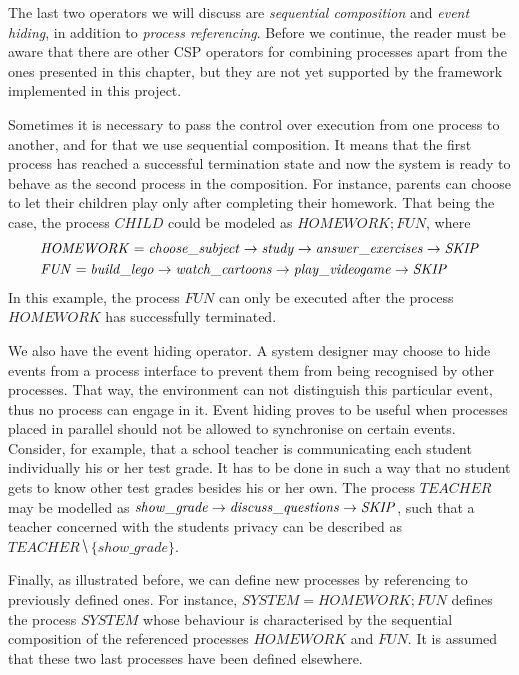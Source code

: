 The last two operators we will discuss are \emph{sequential composition} and \emph{event hiding}, in addition to \emph{process referencing}. Before we continue, the reader must be aware that there are other CSP operators for combining processes apart from the ones presented in this chapter, but they are not yet supported by the framework implemented in this project.

Sometimes it is necessary to pass the control over execution from one process to another, and for that we use sequential composition. It means that the first process has reached a successful termination state and now the system is ready to behave as the second process in the composition. For instance, parents can choose to let their children play only after completing their homework. That being the case, the process $ \mathit{CHILD} $ could be modeled as $ \mathit{HOMEWORK}\!; \mathit{FUN} $, where
\begin{align}
	&\mathit{HOMEWORK} = \mathit{choose\_subject} \mathrel{\rightarrow} \mathit{study} \mathrel{\rightarrow} \mathit{answer\_exercises} \mathrel{\rightarrow} \mathit{\mathord{{SKIP}}} \notag \\
	&\mathit{FUN} = \mathit{build\_lego} \mathrel{\rightarrow} \mathit{watch\_cartoons} \mathrel{\rightarrow} \mathit{play\_videogame} \mathrel{\rightarrow} \mathit{\mathord{{SKIP}}} \notag
\end{align}
In this example, the process $ \mathit{FUN} $ can only be executed after the process $ \mathit{HOMEWORK} $ has successfully terminated.

We also have the event hiding operator. A system designer may choose to hide events from a process interface to prevent them from being recognised by other processes. That way, the environment can not distinguish this particular event, thus no process can engage in it. Event hiding proves to be useful when processes placed in parallel should not be allowed to synchronise on certain events. Consider, for example, that a school teacher is communicating each student individually his or her test grade. It has to be done in such a way that no student gets to know other test grades besides his or her own. The process $ \mathit{TEACHER} $ may be modelled as $ \mathit{show\_grade} \mathrel{\rightarrow} \mathit{discuss\_questions} \mathrel{\rightarrow} \mathit{\mathord{{SKIP}}} $, such that a teacher concerned with the students privacy can be described as $ \mathit{TEACHER} \hide \{show\_grade\} $.

Finally, as illustrated before, we can define new processes by referencing to previously defined ones. For instance, $\mathit{SYSTEM} = \mathit{HOMEWORK}\!; \mathit{FUN} $ defines the process $\mathit{SYSTEM}$ whose behaviour is characterised by the sequential composition of the referenced processes $\mathit{HOMEWORK}$ and $\mathit{FUN}$. It is assumed that these two last processes have been defined elsewhere.

